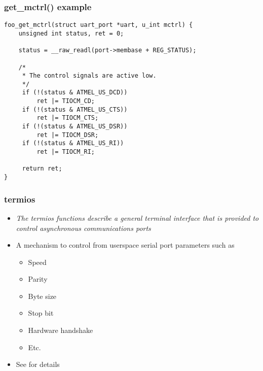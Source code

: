 \begin{frame}[fragile]
\frametitle{get\_mctrl() example}
\begin{verbatim}
foo_get_mctrl(struct uart_port *uart, u_int mctrl) {
    unsigned int status, ret = 0;

    status = __raw_readl(port->membase + REG_STATUS);

    /*
     * The control signals are active low.
     */
     if (!(status & ATMEL_US_DCD))
         ret |= TIOCM_CD;
     if (!(status & ATMEL_US_CTS))
         ret |= TIOCM_CTS;
     if (!(status & ATMEL_US_DSR))
         ret |= TIOCM_DSR;
     if (!(status & ATMEL_US_RI))
         ret |= TIOCM_RI;

     return ret;
}
\end{verbatim}
\end{frame}

\begin{frame}
  \frametitle{termios}
  \begin{itemize}
  \item \emph{The termios functions describe a general terminal
      interface that is provided to control asynchronous
      communications ports}
  \item A mechanism to control from userspace serial port parameters
    such as
    \begin{itemize}
    \item Speed
    \item Parity
    \item Byte size
    \item Stop bit
    \item Hardware handshake
    \item Etc.
    \end{itemize}
  \item See  for details
  \end{itemize}
\end{frame}

